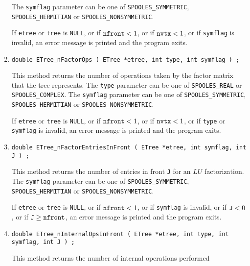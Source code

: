 \begin{enumerate}
The {\tt symflag} parameter can be one of 
{\tt SPOOLES\_SYMMETRIC},
{\tt SPOOLES\_HERMITIAN} or
{\tt SPOOLES\_NONSYMMETRIC}.
\par {}
If {\tt etree} or {\tt tree} is {\tt NULL},
or if $\mbox{\tt nfront} < 1$,
or if $\mbox{\tt nvtx} < 1$,
or if {\tt symflag} is invalid,
an error message is printed and the program exits.
\item
\begin{verbatim}
double ETree_nFactorOps ( ETree *etree, int type, int symflag ) ;
\end{verbatim}
This method returns the number of operations taken by the factor matrix 
that the tree represents.
The {\tt type} parameter can be one of {\tt SPOOLES\_REAL} or
{\tt SPOOLES\_COMPLEX}.
The {\tt symflag} parameter can be one of {\tt SPOOLES\_SYMMETRIC},
{\tt SPOOLES\_HERMITIAN} or {\tt SPOOLES\_NONSYMMETRIC}.
\par {}
If {\tt etree} or {\tt tree} is {\tt NULL},
or if $\mbox{\tt nfront} < 1$,
or if $\mbox{\tt nvtx} < 1$,
or if {\tt type} or {\tt symflag} is invalid,
an error message is printed and the program exits.
\item
\begin{verbatim}
double ETree_nFactorEntriesInFront ( ETree *etree, int symflag, int J ) ;
\end{verbatim}
This method returns the number of entries in front {\tt J} for an
$LU$ factorization.
The {\tt symflag} parameter can be one of {\tt SPOOLES\_SYMMETRIC},
{\tt SPOOLES\_HERMITIAN} or {\tt SPOOLES\_NONSYMMETRIC}.
\par {}
If {\tt etree} or {\tt tree} is {\tt NULL},
or if $\mbox{\tt nfront} < 1$,
or if {\tt symflag} is invalid,
or if ${\tt J} < 0$,
or if ${\tt J} \ge {\tt nfront}$,
an error message is printed and the program exits.
\item
\begin{verbatim}
double ETree_nInternalOpsInFront ( ETree *etree, int type, int symflag, int J ) ;
\end{verbatim}
This method returns the number of internal operations performed 

\end{enumerate}
